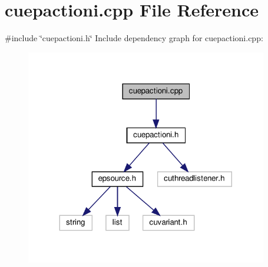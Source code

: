 \section{cuepactioni.\+cpp File Reference}
\label{cuepactioni_8cpp}
{\ttfamily \#include \char`\"{}cuepactioni.\+h\char`\"{}}\newline
Include dependency graph for cuepactioni.\+cpp\+:\nopagebreak
\begin{figure}[H]
\begin{center}
\leavevmode
\includegraphics[width=299pt]{cuepactioni_8cpp__incl}
\end{center}
\end{figure}
